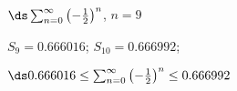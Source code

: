 {$\ds \sum_{n=0}^\infty \left(-\frac12\right)^n$, \quad $n=9$
}
{$S_9 = 0.666016$; $S_{10} = 0.666992$;

$\ds 0.666016 \leq \sum_{n=0}^\infty \left(-\frac12\right)^n \leq 0.666992$
}